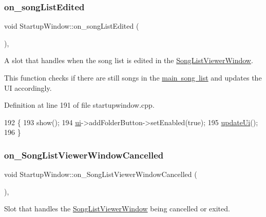 \subsubsection{\texorpdfstring{on\+\_\+song\+List\+Edited}{on\_songListEdited}}
{\footnotesize\ttfamily void Startup\+Window\+::on\+\_\+song\+List\+Edited (\begin{DoxyParamCaption}{ }\end{DoxyParamCaption})\hspace{0.3cm}{\ttfamily [private]}, {\ttfamily [slot]}}



A slot that handles when the song list is edited in the \mbox{\hyperlink{class_song_list_viewer_window}{Song\+List\+Viewer\+Window}}. 

This function checks if there are still songs in the \mbox{\hyperlink{class_startup_window_ae57241505d74639131cb0ece2cfc922b}{main song list}} and updates the UI accordingly. 

Definition at line 191 of file startupwindow.\+cpp.


\begin{DoxyCode}
192 \{
193     show();
194     \mbox{\hyperlink{class_startup_window_a5afeeaabe9a34a02a67d2e7d9f36dc09}{ui}}->addFolderButton->setEnabled(\textcolor{keyword}{true});
195     \mbox{\hyperlink{class_startup_window_a910d56e4b640d6b7b27a6de2ae18d736}{updateUi}}();
196 \}
\end{DoxyCode}
\mbox{\label{class_startup_window_a049e5d9f548d809e89f546d29def2707}} 
\subsubsection{\texorpdfstring{on\+\_\+\+Song\+List\+Viewer\+Window\+Cancelled}{on\_SongListViewerWindowCancelled}}
{\footnotesize\ttfamily void Startup\+Window\+::on\+\_\+\+Song\+List\+Viewer\+Window\+Cancelled (\begin{DoxyParamCaption}{ }\end{DoxyParamCaption})\hspace{0.3cm}{\ttfamily [private]}, {\ttfamily [slot]}}



Slot that handles the \mbox{\hyperlink{class_song_list_viewer_window}{Song\+List\+Viewer\+Window}} being cancelled or exited. 

